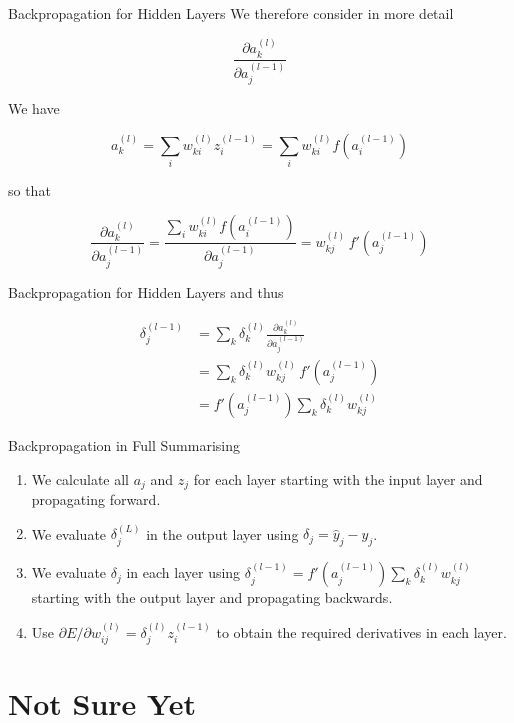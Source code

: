 \documentclass{beamer}
\begin{document}
\begin{frame}[fragile]{Backpropagation for Hidden Layers}
We therefore consider in more detail

$$
\frac{\partial a_k^{(l)}}{\partial a_j^{(l-1)}}
$$

We have

$$
a_k^{(l)} = \sum_i w_{ki}^{(l)}z_i^{(l-1)} = \sum_i w_{ki}^{(l)} f(a_i^{(l-1)})
$$

so that

$$
\frac{\partial a_k^{(l)}}{\partial a_j^{(l-1)}} =
\frac{\sum_i w_{ki}^{(l)} f(a_i^{(l-1)})}{\partial a_j^{(l-1)}} =
w_{kj}^{(l)}\,f'(a_j^{(l-1)})
$$
\end{frame}

\begin{frame}[fragile]{Backpropagation for Hidden Layers}
and thus

$$
\begin{aligned}
\delta_j^{(l-1)} &=
\sum_k \delta_k^{(l)}\frac{\partial
  a_k^{(l)}}{\partial a_j^{(l-1)}} \\
&= \sum_k \delta_k^{(l)} w_{kj}^{(l)}\, f'(a_j^{(l-1)}) \\
&= f'(a_j^{(l-1)}) \sum_k \delta_k^{(l)} w_{kj}^{(l)}
\end{aligned}
$$
\end{frame}

\begin{frame}[fragile]{Backpropagation in Full}
Summarising

\begin{enumerate}
\item
We calculate all $a_j$ and $z_j$ for each layer starting with the
input layer and propagating forward.
\item
We evaluate $\delta_j^{(L)}$ in the output layer using $\delta_j = \hat{y}_j - y_j$.
\item
We evaluate $\delta_j$ in each layer using $\delta_j^{(l-1)} =
f'(a_j^{(l-1)})\sum_k \delta_k^{(l)} w_{kj}^{(l)}$ starting with the output
layer and propagating backwards.
\item
Use $\partial E / \partial w_{ij}^{(l)} = \delta_j^{(l)} z_i^{(l-1)}$ to obtain the
required derivatives in each layer.
\end{enumerate}
\end{frame}

\section{Not Sure Yet}
\end{document}
